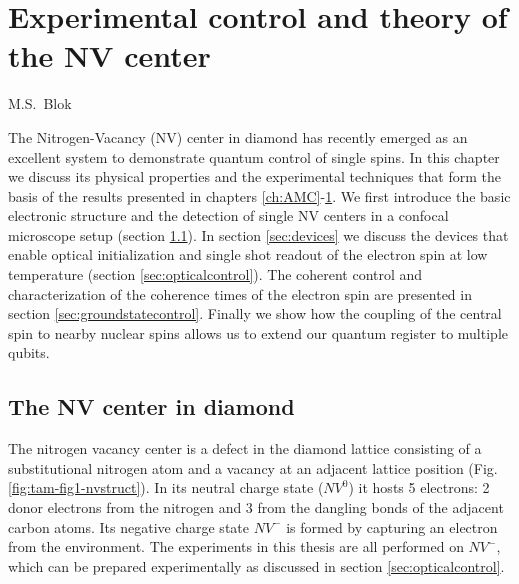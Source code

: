 \graphicspath{{./ch_theory_and_methods/figures/}}


\chapter{Experimental control and theory of the NV center}
\label{ch:CDL}

\begin{center} 
    \vspace{-1cm} {M.S.~Blok} 
\end{center}


\vspace{-0.5cm} 
The Nitrogen-Vacancy (NV) center in diamond has recently emerged as an excellent system to demonstrate quantum control of single spins. In this chapter we discuss its physical properties and the experimental techniques that form the basis of the results presented in chapters \ref{ch:AMC}-\ref{ch:CDL}. We first introduce the basic electronic structure and the detection of single NV centers in a confocal microscope setup (section \ref{sec:NVcenter}). In section \ref{sec:devices} we discuss the devices that enable optical initialization and single shot readout of the electron spin at low temperature (section \ref{sec:opticalcontrol}). The coherent control and characterization of the coherence times of the electron spin are presented in section \ref{sec:groundstatecontrol}. Finally we show how the coupling of the central spin to nearby nuclear spins allows us to extend our quantum register to multiple qubits.
\clearpage


\section{The NV center in diamond}
\label{sec:NVcenter}

The nitrogen vacancy center is a defect in the diamond lattice consisting of a substitutional nitrogen atom and a vacancy at an adjacent lattice position (Fig. \ref{fig:tam-fig1-nvstruct}). In its neutral charge state ($NV^{0}$) it hosts 5 electrons: 2 donor electrons from the nitrogen and 3 from the dangling bonds of the adjacent carbon atoms. Its negative charge state $NV^{-}$ is formed by capturing an electron from the environment. The experiments in this thesis are all performed on $NV^{-}$, which can be prepared experimentally as discussed in section \ref{sec:opticalcontrol}.


